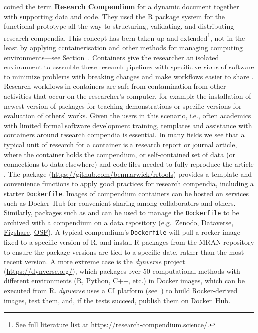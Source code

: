 \citet{gentleman_statistical_2007} coined the term \textbf{Research
Compendium} for a dynamic document together with supporting data and
code. They used the R package system \citep{core_writing_1999} for the
functional prototype all the way to structuring, validating, and
distributing research compendia. This concept has been taken up and
extended\footnote{See full literature list at \href{https://research-compendium.science/}{https://research-compendium.science/}.},
not in the least by applying containerisation and other methods for
managing computing environments---see Section~. Containers
give the researcher an isolated environment to assemble these research
pipelines with specific versions of software to minimize problems with
breaking changes and make workflows easier to share
\citep[cf.][]{boettiger_introduction_2015,marwick_packaging_2018}.
Research workflows in containers are safe from contamination from other
activities that occur on the researcher's computer, for example the
installation of newest version of packages for teaching demonstrations
or specific versions for evaluation of others' works. Given the users in
this scenario, i.e., often academics with limited formal software
development training, templates and assistance with containers around
research compendia is essential. In many fields we see that a typical
unit of research for a container is a research report or journal
article, where the container holds the compendium, or self-contained set
of data (or connections to data elsewhere) and code files needed to
fully reproduce the article \citep{marwick_packaging_2018}. The package
 (\url{https://github.com/benmarwick/rrtools}) provides a
template and convenience functions to apply good practices for research
compendia, including a starter \texttt{Dockerfile}. Images of compendium
containers can be hosted on services such as Docker~Hub for convenient
sharing among collaborators and others. Similarly, packages such as
 and  can be used to manage the
\texttt{Dockerfile} to be archived with a compendium on a data
repository (e.g.~\href{https://zenodo.org/}{Zenodo},
\href{https://dataverse.org/}{Dataverse},
\href{https://figshare.com/}{Figshare}, \href{https://osf.io/}{OSF}). A
typical compendium's \texttt{Dockerfile} will pull a rocker image fixed
to a specific version of R, and install R packages from the MRAN
repository to ensure the package versions are tied to a specific date,
rather than the most recent version. A more extreme case is the
\emph{dynverse} project (\url{https://dynverse.org/}), which packages
over 50 computational methods with different environments (R, Python,
C++, etc.) in Docker images, which can be executed from R.
\emph{dynverse} uses a CI platform (see~) to build
Rocker-derived images, test them, and, if the tests succeed, publish
them on Docker~Hub.

